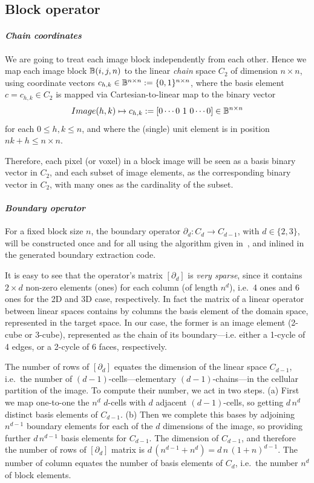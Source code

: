 \documentclass[11pt, oneside]{amsart}   	%
\begin{document}
\subsection{Block operator }\label{sec:block}

\paragraph{\emph{Chain coordinates }\label{sec:bbbb}}
We are going to treat each image block independently from each other. Hence we map each image block $\mathbb{B}(i,j,n)$ to the linear \emph{chain} space $C_2$ of dimension $n\times n$, using coordinate vectors $c_{h,k}\in \mathbb{B}^{n\times n} := \{0,1\}^{n\times n}$, where the basis element $c = c_{h,k} \in C_2$ is mapped via Cartesian-to-linear map to the binary vector 
\[
Image(h,k) \mapsto c_{h,k} := [0 \cdots 0\ 1\ 0 \cdots 0] \in \mathbb{B}^{n\times n}
\]
for each $0\leq h,k \leq n$, and where the (single) unit element is in position $nk + h \leq n\times n$.

Therefore, each pixel (or voxel) in a block image will be seen as a basis binary vector in $C_2$, and each subset of image elements, as the corresponding binary vector in $C_2$, with many ones as the cardinality of the subset.

\paragraph{\emph{Boundary operator }\label{sec:bbbb}}For a fixed block size $n$, the boundary operator $\partial_d : C_d\to C_{d-1}$, with $d\in\{2,3\}$, will be constructed once and for all using the algorithm given in~\cite{}, and inlined in the generated boundary extraction code.

It is easy to see that the operator's matrix $[\partial_d]$ is \emph{very sparse}, since it contains $2\times d$ non-zero elements (ones) for each column (of length $n^d$), i.e.~4 ones and 6 ones for the 2D and 3D case, respectively. In fact the matrix of a linear operator between linear spaces contains by columns the basis element of the domain space, represented in the target space. In our case, the former is an image element (2-cube or 3-cube), represented as the chain of its boundary---i.e. either a 1-cycle of 4 edges, or  a 2-cycle of 6 faces, respectively.  

The number of rows of $[\partial_d]$ equates the dimension of the linear space $C_{d-1}$, i.e.~the number of $(d-1)$-cells---elementary $(d-1)$-chains---in the cellular partition of the image. To compute their number, we act in two steps. (a) First we map one-to-one the $n^d$ $d$-cells with $d$ adjacent $(d-1)$-cells, so getting $d\,n^d$ distinct basis elements of $C_{d-1}$. (b) Then we complete this bases by adjoining $n^{d-1}$ boundary elements for each of the $d$ dimensions of the image, so providing further $d\,n^{d-1}$ basis elements for $C_{d-1}$. The dimension of $C_{d-1}$, and therefore the number of rows of $[\partial_d]$ matrix is $d\,(n^{d-1}+n^{d}) = d\,n\,(1+n)^{d-1}$. The number of column equates the number of basis elements of $C_d$, i.e.~the number $n^d$ of block elements.
\end{document}
